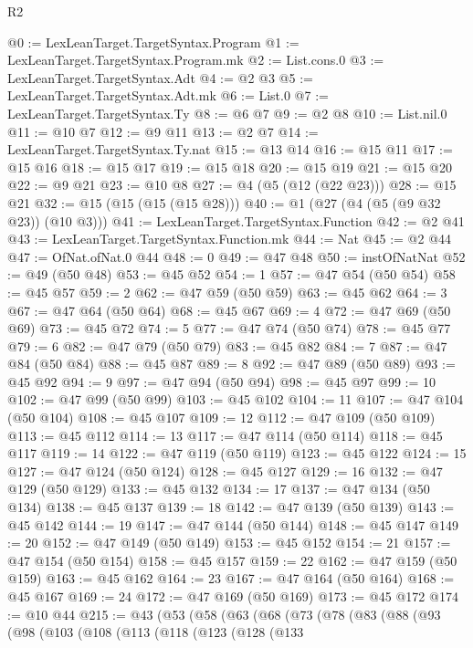 \begin{lexlean}{R2}
\begin{coremodule}
@0 := LexLeanTarget.TargetSyntax.Program
@1 := LexLeanTarget.TargetSyntax.Program.mk
@2 := List.cons.{0}
@3 := LexLeanTarget.TargetSyntax.Adt
@4 := @2 @3
@5 := LexLeanTarget.TargetSyntax.Adt.mk
@6 := List.{0}
@7 := LexLeanTarget.TargetSyntax.Ty
@8 := @6 @7
@9 := @2 @8
@10 := List.nil.{0}
@11 := @10 @7
@12 := @9 @11
@13 := @2 @7
@14 := LexLeanTarget.TargetSyntax.Ty.nat
@15 := @13 @14
@16 := @15 @11
@17 := @15 @16
@18 := @15 @17
@19 := @15 @18
@20 := @15 @19
@21 := @15 @20
@22 := @9 @21
@23 := @10 @8
@27 := @4 (@5 (@12 (@22 @23)))
@28 := @15 @21
@32 := @15 (@15 (@15 (@15 @28)))
@40 := @1 (@27 (@4 (@5 (@9 @32 @23)) (@10 @3)))
@41 := LexLeanTarget.TargetSyntax.Function
@42 := @2 @41
@43 := LexLeanTarget.TargetSyntax.Function.mk
@44 := Nat
@45 := @2 @44
@47 := OfNat.ofNat.{0} @44
@48 := 0
@49 := @47 @48
@50 := instOfNatNat
@52 := @49 (@50 @48)
@53 := @45 @52
@54 := 1
@57 := @47 @54 (@50 @54)
@58 := @45 @57
@59 := 2
@62 := @47 @59 (@50 @59)
@63 := @45 @62
@64 := 3
@67 := @47 @64 (@50 @64)
@68 := @45 @67
@69 := 4
@72 := @47 @69 (@50 @69)
@73 := @45 @72
@74 := 5
@77 := @47 @74 (@50 @74)
@78 := @45 @77
@79 := 6
@82 := @47 @79 (@50 @79)
@83 := @45 @82
@84 := 7
@87 := @47 @84 (@50 @84)
@88 := @45 @87
@89 := 8
@92 := @47 @89 (@50 @89)
@93 := @45 @92
@94 := 9
@97 := @47 @94 (@50 @94)
@98 := @45 @97
@99 := 10
@102 := @47 @99 (@50 @99)
@103 := @45 @102
@104 := 11
@107 := @47 @104 (@50 @104)
@108 := @45 @107
@109 := 12
@112 := @47 @109 (@50 @109)
@113 := @45 @112
@114 := 13
@117 := @47 @114 (@50 @114)
@118 := @45 @117
@119 := 14
@122 := @47 @119 (@50 @119)
@123 := @45 @122
@124 := 15
@127 := @47 @124 (@50 @124)
@128 := @45 @127
@129 := 16
@132 := @47 @129 (@50 @129)
@133 := @45 @132
@134 := 17
@137 := @47 @134 (@50 @134)
@138 := @45 @137
@139 := 18
@142 := @47 @139 (@50 @139)
@143 := @45 @142
@144 := 19
@147 := @47 @144 (@50 @144)
@148 := @45 @147
@149 := 20
@152 := @47 @149 (@50 @149)
@153 := @45 @152
@154 := 21
@157 := @47 @154 (@50 @154)
@158 := @45 @157
@159 := 22
@162 := @47 @159 (@50 @159)
@163 := @45 @162
@164 := 23
@167 := @47 @164 (@50 @164)
@168 := @45 @167
@169 := 24
@172 := @47 @169 (@50 @169)
@173 := @45 @172
@174 := @10 @44
@215 := @43
    (@53
      (@58
        (@63
          (@68
            (@73
              (@78
                (@83
                  (@88
                    (@93
                      (@98
                        (@103
                          (@108
                            (@113
                              (@118
                                (@123
                                  (@128
                                    (@133

\end{coremodule}
\end{lexlean}
